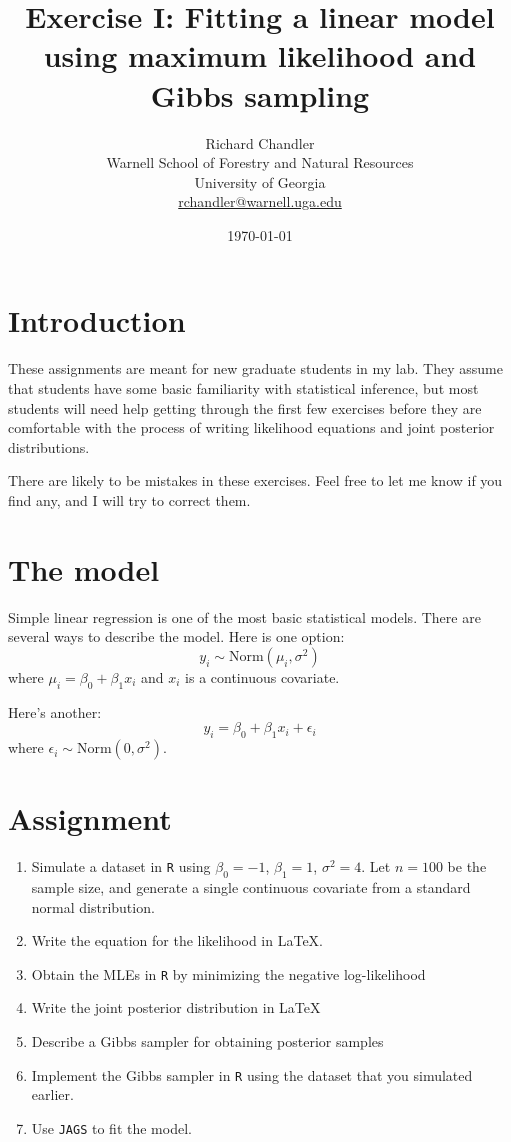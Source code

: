\documentclass[11pt]{article}
\begin{document}
\title{Exercise I: Fitting a linear model using maximum likelihood and
  Gibbs sampling}
\author{Richard Chandler \\ Warnell School of Forestry and Natural
  Resources \\ University of Georgia \\ \href{mailto:rchandler@warnell.uga.edu}{rchandler@warnell.uga.edu}
}
\date{\today}

\maketitle


\section*{Introduction}

These assignments are meant for new graduate students in my lab. They
assume that students have some basic familiarity with statistical
inference, but most students will need help getting through the first
few exercises before they are comfortable with the process of writing
likelihood equations and joint posterior distributions.

There are likely to be mistakes in these exercises. Feel free to let
me know if you find any, and I will try to correct them.


\section*{The model}

Simple linear regression is one of the most basic statistical
models. There are several ways to describe the model. Here is one
option:
\[
  y_i \sim \mathrm{Norm}(\mu_i,\sigma^2)
\]
where $\mu_i = \beta_0 + \beta_1 x_i$ and $x_i$ is a continuous covariate.

Here's another:
\[
  y_i = \beta_0 + \beta_1 x_i + \epsilon_i
\]
where $\epsilon_i \sim \mathrm{Norm}(0, \sigma^2)$.

\section*{Assignment}


\begin{enumerate}
  \item Simulate a dataset in {\tt R} using $\beta_0=-1$, $\beta_1=1$,
    $\sigma^2=4$. Let $n=100$ be the sample size, and generate a
    single continuous covariate from a standard normal distribution.
  \item Write the equation for the likelihood in \LaTeX.
  \item Obtain the MLEs in {\tt R} by minimizing the negative log-likelihood
  \item Write the joint posterior distribution in \LaTeX
  \item Describe a Gibbs sampler for obtaining posterior samples
  \item Implement the Gibbs sampler in {\tt R} using the dataset that
    you simulated earlier.
  \item Use {\tt JAGS} to fit the model.
\end{enumerate}
\end{document}
